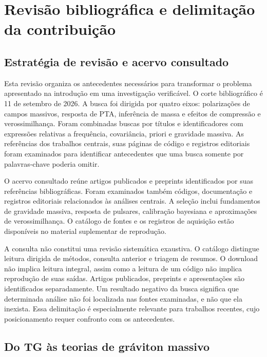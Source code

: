 \chapter[Revisão bibliográfica]{Revisão bibliográfica e delimitação da contribuição}
\label{chap:revisao}

\section{Estratégia de revisão e acervo consultado}

Esta revisão organiza os antecedentes necessários para transformar o
problema apresentado na introdução em uma investigação verificável.
O corte bibliográfico é 11 de setembro de 2026. A busca foi dirigida por
quatro eixos: polarizações de campos massivos, resposta de PTA,
inferência de massa e efeitos de compressão e verossimilhança. Foram
combinadas buscas por títulos e identificadores com expressões relativas
a frequência, covariância, priori e gravidade massiva. As referências
dos trabalhos centrais, suas páginas de código e registros editoriais
foram examinados para identificar antecedentes que uma busca somente
por palavras-chave poderia omitir.

O acervo consultado reúne artigos publicados e preprints identificados por suas referências bibliográficas. Foram examinados também códigos, documentação e registros editoriais relacionados às análises centrais. A seleção inclui fundamentos de gravidade massiva, resposta de pulsares, calibração bayesiana e aproximações de verossimilhança. O catálogo de fontes e os registros de aquisição estão disponíveis no material suplementar de reprodução.

A consulta não constitui uma revisão sistemática exaustiva. O catálogo
distingue leitura dirigida de métodos, consulta anterior e triagem de
resumos. O download não implica leitura integral, assim como a leitura
de um código não implica reprodução de suas saídas. Artigos publicados,
preprints e apresentações são identificados separadamente. Um resultado
negativo da busca significa que determinada análise não foi localizada
nas fontes examinadas, e não que ela inexista. Essa delimitação é
especialmente relevante para trabalhos recentes, cujo posicionamento requer confronto com os antecedentes.

\section{Do TG às teorias de gráviton massivo}

